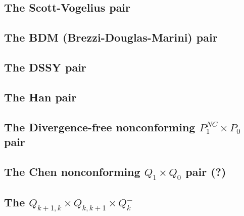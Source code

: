 \subsection{The Scott-Vogelius pair} \label{ss:scott_vogelius}


\subsection{The BDM (Brezzi-Douglas-Marini) pair} \label{ss:bdm}


\subsection{The DSSY pair} \label{ss:pair_dssy2D}


\subsection{The Han pair} \label{ss:han}


\subsection{The Divergence-free nonconforming ${ P}_1^{NC}\times P_0$ pair} \label{ss:p1ncp0}


\subsection{The Chen nonconforming ${ Q}_1\times Q_0$ pair (?)} \label{ss:chenq0}


\subsection{The $Q_{k+1,k}\times Q_{k,k+1} \times Q_{k}^-$ \label{ss:qqq_elt}}


